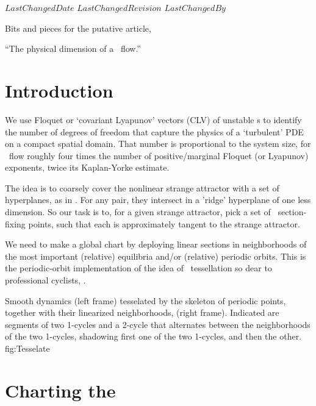 \ifsvnmulti
 {$LastChangedDate$}
 {$LastChangedRevision$} {$LastChangedBy$}
\fi

Bits and pieces for the putative article,

``The physical dimension of a \KS\ flow.''

\section{Introduction}
\label{sect:intro}

We use Floquet or `covariant Lyapunov'
vectors (CLV) of unstable \po s to identify the number of degrees of freedom
that capture the physics of a `turbulent' PDE on a compact spatial
domain.
That number is proportional to the
system size, for \KS\ flow roughly four times the number of
 positive/marginal Floquet (or Lyapunov) exponents, twice its
Kaplan-Yorke estimate.

The idea is to coarsely cover the nonlinear strange attractor with a set
of hyperplanes, as in . For any pair, they
intersect in a 'ridge' hyperplane of one less dimension. So our task
is to, for a given strange attractor, pick a set of \Poincare\ section-fixing points,
such that each is approximately tangent to the strange attractor.

We need to make a global chart by deploying linear
{\Poincare} sections in neighborhoods of the most important (relative)
equilibria and/or (relative) periodic orbits. This is the
periodic-orbit implementation of the idea of {\statesp\ tessellation} so
dear to professional cyclists, .

{}{
Smooth dynamics  (left frame) tesselated by the skeleton of periodic
points, together with their linearized neighborhoods, (right frame).
Indicated are segments of two 1-cycles and a 2-cycle that alternates
between the neighborhoods of the two 1-cycles, shadowing first one of the
two 1-cycles, and then the other.
}{fig:Tesselate} %
%
%

\section{Charting the \statesp}
	\label{sec:chart}

